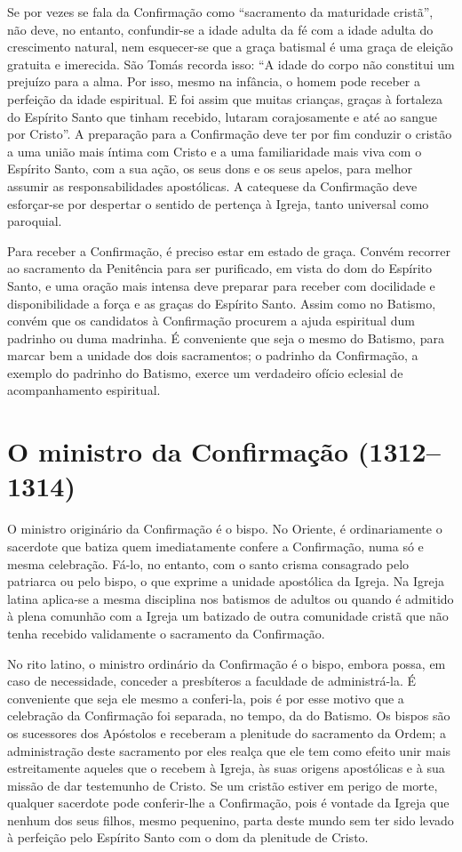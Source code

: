 Se por vezes se fala da Confirmação como ``sacramento da maturidade cristã'', não deve, no entanto, confundir-se a idade adulta da fé com a idade adulta do crescimento natural, nem esquecer-se que a graça batismal é uma graça de eleição gratuita e imerecida. São Tomás recorda isso: ``A idade do corpo não constitui um prejuízo para a alma. Por isso, mesmo na infância, o homem pode receber a perfeição da idade espiritual. E foi assim que muitas crianças, graças à fortaleza do Espírito Santo que tinham recebido, lutaram corajosamente e até ao sangue por Cristo''. A preparação para a Confirmação deve ter por fim conduzir o cristão a uma união mais íntima com Cristo e a uma familiaridade mais viva com o Espírito Santo, com a sua ação, os seus dons e os seus apelos, para melhor assumir as responsabilidades apostólicas. A catequese da Confirmação deve esforçar-se por despertar o sentido de pertença à Igreja, tanto universal como paroquial.

Para receber a Confirmação, é preciso estar em estado de graça. Convém recorrer ao sacramento da Penitência para ser purificado, em vista do dom do Espírito Santo, e uma oração mais intensa deve preparar para receber com docilidade e disponibilidade a força e as graças do Espírito Santo. Assim como no Batismo, convém que os candidatos à Confirmação procurem a ajuda espiritual dum padrinho ou duma madrinha. É conveniente que seja o mesmo do Batismo, para marcar bem a unidade dos dois sacramentos; o padrinho da Confirmação, a exemplo do padrinho do Batismo, exerce um verdadeiro ofício eclesial de acompanhamento espiritual.

\section{O ministro da Confirmação (1312--1314)}

O ministro originário da Confirmação é o bispo. No Oriente, é ordinariamente o sacerdote que batiza quem imediatamente confere a Confirmação, numa só e mesma celebração. Fá-lo, no entanto, com o santo crisma consagrado pelo patriarca ou pelo bispo, o que exprime a unidade apostólica da Igreja. Na Igreja latina aplica-se a mesma disciplina nos batismos de adultos ou quando é admitido à plena comunhão com a Igreja um batizado de outra comunidade cristã que não tenha recebido validamente o sacramento da Confirmação.

No rito latino, o ministro ordinário da Confirmação é o bispo, embora possa, em caso de necessidade, conceder a presbíteros a faculdade de administrá-la. É conveniente que seja ele mesmo a conferi-la, pois é por esse motivo que a celebração da Confirmação foi separada, no tempo, da do Batismo. Os bispos são os sucessores dos Apóstolos e receberam a plenitude do sacramento da Ordem; a administração deste sacramento por eles realça que ele tem como efeito unir mais estreitamente aqueles que o recebem à Igreja, às suas origens apostólicas e à sua missão de dar testemunho de Cristo. Se um cristão estiver em perigo de morte, qualquer sacerdote pode conferir-lhe a Confirmação, pois é vontade da Igreja que nenhum dos seus filhos, mesmo pequenino, parta deste mundo sem ter sido levado à perfeição pelo Espírito Santo com o dom da plenitude de Cristo.

